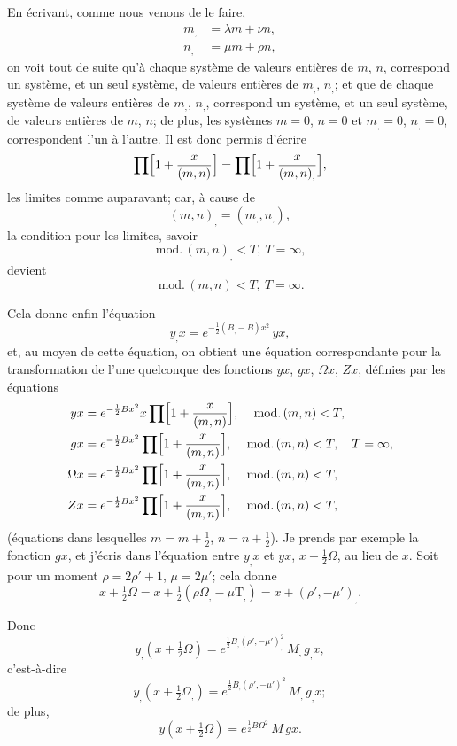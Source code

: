 \documentclass[11pt,a4paper]{article}
\providecommand{\md}{\,\mathrm{mod.}\,}
\begin{document}
En \'ecrivant, comme nous venons de le faire,
\begin{align*}
m_{,} &= \lambda m + \nu n,\\
n_{,} &= \mu m + \rho n,
\end{align*}
on voit tout de suite qu'\`a chaque syst\`eme de valeurs enti\`eres de $m$, $n$, correspond un syst\`eme, et un seul syst\`eme, de valeurs enti\`eres de $m_{,}$, $n_{,}$; et que de chaque syst\`eme de valeurs enti\`eres de $m_{,}$, $n_{,}$, correspond un syst\`eme, et un seul syst\`eme, de valeurs enti\`eres de $m$, $n$; de plus, les syst\`emes $m = 0$, $n = 0$ et $m_{,} = 0$, $n_{,} = 0$, correspondent l'un \`a l'autre. Il est donc permis d'\'ecrire
\[
\prod \Bigl[1 + \frac{x}{(m, n)}\Bigr] = \prod \Bigl[1 + \frac{x}{(m, n)_{,}}\Bigr],
\]
les limites comme auparavant; car, \`a cause de
\[ (m, n)_{,} = (m_{,}, n_{,}), \]
la condition pour les limites, savoir
\[ \md(m, n)_{,} < T,\ T = \infty, \]
devient
\[ \md(m, n) < T,\ T = \infty. \]

\medskip

Cela donne enfin l'\'equation
\[
y_{,} x = e^{-\frac{1}{2}(B_{,} - B) x^2}\, yx,
\]
et, au moyen de cette \'equation, on obtient une \'equation correspondante pour la transformation de l'une quelconque des fonctions $yx$, $gx$, $\Omega x$, $Zx$, d\'efinies par les \'equations
\begin{align*}
yx &= e^{-\frac{1}{2}B x^2} x \prod \Bigl[1 + \frac{x}{(m, n)}\Bigr],\quad \md(m, n) < T,\\
gx &= e^{-\frac{1}{2}B x^2} \prod \Bigl[1 + \frac{x}{(m, n)}\Bigr],\quad \md(m, n) < T,\quad T = \infty,\\
\Omega x &= e^{-\frac{1}{2}B x^2} \prod \Bigl[1 + \frac{x}{(m, n)}\Bigr],\quad \md(m, n) < T,\\
Zx &= e^{-\frac{1}{2}B x^2} \prod \Bigl[1 + \frac{x}{(m, n)}\Bigr],\quad \md(m, n) < T,
\end{align*}
(\'equations dans lesquelles $m = m + \tfrac{1}{2}$, $n = n + \tfrac{1}{2}$). Je prends par exemple la fonction $gx$, et j'\'ecris dans l'\'equation entre $y_{,} x$ et $yx$, $x + \tfrac{1}{2}\Omega$, au lieu de $x$. Soit pour un moment $\rho = 2\rho' + 1$, $\mu = 2\mu'$; cela donne
\[
x + \tfrac{1}{2}\Omega = x + \tfrac{1}{2}(\rho\Omega_{,} - \mu\mathrm{T}_{,}) = x + (\rho', -\mu')_{,}.
\]

Donc
\[
y_{,}(x + \tfrac{1}{2}\Omega) = e^{\frac{1}{2}B_{,}(\rho', -\mu')_{,}^{2}}\, M_{,}\, g_{,} x,
\]
c'est-\`a-dire
\[
y_{,}(x + \tfrac{1}{2}\Omega_{,}) = e^{\frac{1}{2}B_{,}(\rho', -\mu')_{,}^{2}}\, M_{,}\, g_{,} x;
\]
de plus,
\[
y(x + \tfrac{1}{2}\Omega) = e^{\frac{1}{2}B \Omega^2}\, M\, g x.
\]
\end{document}
